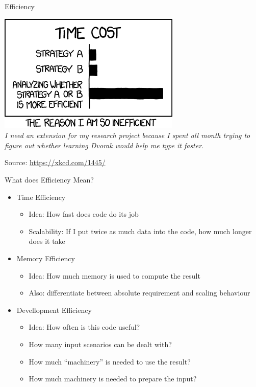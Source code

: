 
\begin{frame}[t,plain]
\titlepage
\end{frame}


\begin{frame}{Efficiency}
%
\begin{center}
	\includegraphics[width=.4\linewidth]{./gfx/xkcd-efficiency}\\
	\emph{I need an extension for my research project because I spent all month trying to figure out whether learning Dvorak would help me type it faster.}

	\vspace{6pt}
	Source: \url{https://xkcd.com/1445/}
\end{center}
%
\end{frame}


\begin{frame}{What does Efficiency Mean?}
%
\begin{itemize}
\item Time Efficiency
	\begin{itemize}
	\item Idea: How fast does code do its job
	\item Scalability: If I put twice as much data into the code, how much longer does it take
	\end{itemize}
\item Memory Efficiency
	\begin{itemize}
	\item Idea: How much memory is used to compute the result
	\item Also: differentiate between absolute requirement and scaling behaviour
	\end{itemize}
\item Devellopment Efficiency
	\begin{itemize}
	\item Idea: How often is this code useful?
	\item How many input scenarios can be dealt with?
	\item How much \enquote{machinery} is needed to use the result?
	\item How much machinery is needed to prepare the input?
	\end{itemize}
\end{itemize}
%
\end{frame}

